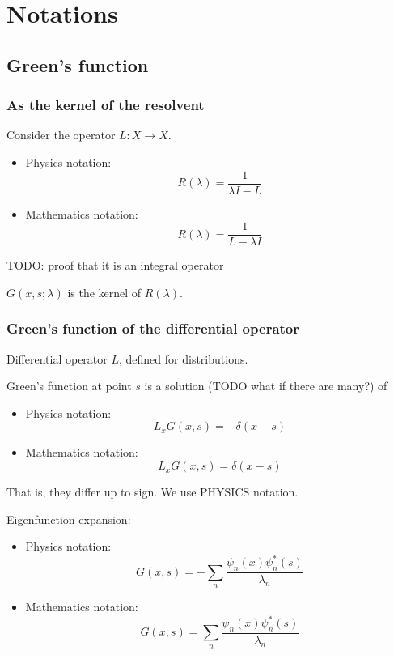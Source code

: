 \documentclass[12pt, a4paper]{article}
\begin{document}
\section{Notations}

\subsection{Green's function}

\subsubsection{As the kernel of the resolvent}
Consider the operator $L: X \to X$.

\begin{itemize}
\item Physics notation: $$R(\lambda) = \frac{1}{\lambda I - L}$$
\item Mathematics notation: $$R(\lambda) = \frac{1}{L - \lambda I}$$
\end{itemize} 

TODO: proof that it is an integral operator

$G(x, s; \lambda)$ is the kernel of $R(\lambda)$.


\subsubsection{Green's function of the differential operator}
Differential operator $L$, defined for distributions.

Green's function at point $s$ is a solution (TODO what if there are many?) of 

\begin{itemize}
\item Physics notation: $$L_x G(x, s) = -\delta(x - s)$$
\item Mathematics notation: $$L_x G(x, s) = \delta(x - s)$$
\end{itemize} 

That is, they differ up to sign. We use PHYSICS notation.

Eigenfunction expansion: 

\begin{itemize}
\item Physics notation: $$G(x, s) = -\sum\limits_n \frac{\psi_n(x) \psi_n^*(s)}{\lambda_n}$$
\item Mathematics notation: $$G(x, s) = \sum\limits_n \frac{\psi_n(x) \psi_n^*(s)}{\lambda_n}$$
\end{itemize} 
\end{document}
